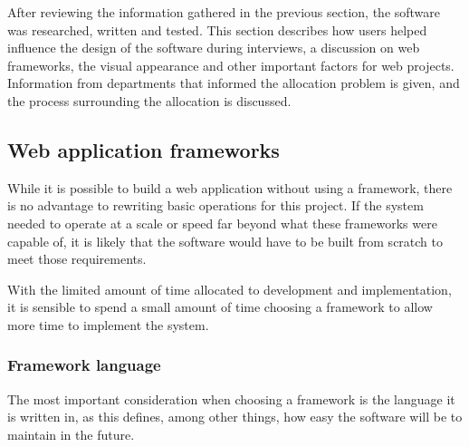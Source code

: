 \documentclass[draft]{scrartcl}
\begin{document}

After reviewing the information gathered in the previous section, the software
was researched, written and tested. This section describes how users helped
influence the design of the software during interviews, a discussion on web
frameworks, the visual appearance and other important factors for web
projects. Information from departments that informed the allocation problem is
given, and the process surrounding the allocation is discussed.





\subsection{Web application frameworks}
\label{sec:webframeworks}


While it is possible to build a web application without using a framework,
there is no advantage to rewriting basic operations for this project. If the
system needed to operate at a scale or speed far beyond what these frameworks
were capable of, it is likely that the software would have to be built from
scratch to meet those requirements.

With the limited amount of time allocated to development and implementation,
it is sensible to spend a small amount of time choosing a framework to allow
more time to implement the system.


\subsubsection{Framework language}


The most important consideration when choosing a framework is the language it
is written in, as this defines, among other things, how easy the software will
be to maintain in the future.

\end{document}
